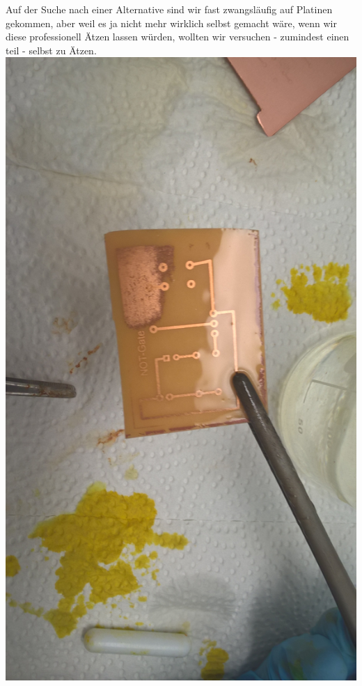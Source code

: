 \documentclass{scrartcl}
\begin{document}
    Auf der Suche nach einer Alternative sind wir fast zwangsläufig auf Platinen gekommen, aber weil es ja nicht mehr wirklich selbst gemacht wäre, wenn wir diese professionell Ätzen lassen würden,
    wollten wir versuchen - zumindest einen teil - selbst zu Ätzen.
    \includegraphics{Handy/WP_20210704_20_54_21_Pro}
\end{document}
